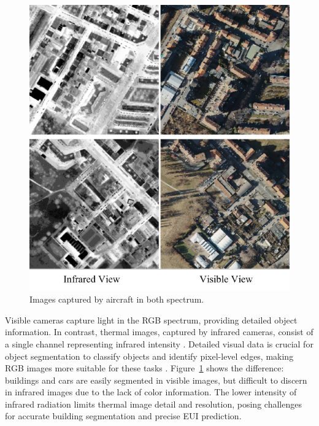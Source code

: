 \documentclass{article}
\theoremstyle{plain}
\theoremstyle{definition}
\theoremstyle{remark}
\begin{document}
\begin{figure}[t]
\centering
\centerline{\includegraphics[scale=0.7 ]{figs/demo_image_offical.pdf}}
\caption{Images captured by aircraft in both spectrum.}
\label{demo}
\end{figure}

Visible cameras capture light in the RGB spectrum, providing detailed object information. In contrast, thermal images, captured by infrared cameras, consist of a single channel representing infrared intensity \cite{gade2014thermal}. Detailed visual data is crucial for object segmentation to classify objects and identify pixel-level edges, making RGB images more suitable for these tasks \cite{he2017mask,kirillov2023segment}. Figure~\ref{demo} shows the difference: buildings and cars are easily segmented in visible images, but difficult to discern in infrared images due to the lack of color information. The lower intensity of infrared radiation limits thermal image detail and resolution, posing challenges for accurate building segmentation and precise EUI prediction.
\end{document}
